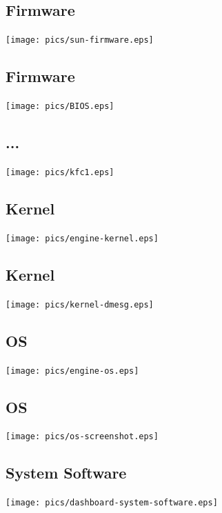 \documentclass[xga]{xdvislides}
\begin{document}
\subsection{Firmware}
\begin{center}
	\texttt{[image: pics/sun-firmware.eps]}
\end{center}

\subsection{Firmware}
\begin{center}
	\texttt{[image: pics/BIOS.eps]}
\end{center}

\subsection{...}
\begin{center}
	\texttt{[image: pics/kfc1.eps]}
\end{center}

\subsection{Kernel}
\begin{center}
	\texttt{[image: pics/engine-kernel.eps]}
\end{center}

\subsection{Kernel}
\begin{center}
	\texttt{[image: pics/kernel-dmesg.eps]}
\end{center}

\subsection{OS}
\begin{center}
	\texttt{[image: pics/engine-os.eps]}
\end{center}

\subsection{OS}
\begin{center}
	\texttt{[image: pics/os-screenshot.eps]}
\end{center}

\subsection{System Software}
\begin{center}
	\texttt{[image: pics/dashboard-system-software.eps]}
\end{center}
\end{document}
